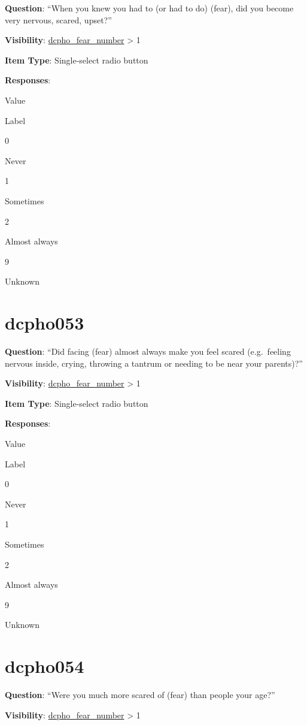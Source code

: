 \documentclass[]{book}
\begin{document}
\textbf{Question}: ``When you knew you had to (or had to do) (fear), did you become very nervous, scared, upset?''

\textbf{Visibility}: \protect\hyperlink{dcpho_fear_number}{dcpho\_fear\_number} \textgreater{} 1

\textbf{Item Type}: Single-select radio button

\textbf{Responses}:

Value

Label

0

Never

1

Sometimes

2

Almost always

9

Unknown

\hypertarget{dcpho053}{%
\section{dcpho053}\label{dcpho053}}

\textbf{Question}: ``Did facing (fear) almost always make you feel scared (e.g.~feeling nervous inside, crying, throwing a tantrum or needing to be near your parents)?''

\textbf{Visibility}: \protect\hyperlink{dcpho_fear_number}{dcpho\_fear\_number} \textgreater{} 1

\textbf{Item Type}: Single-select radio button

\textbf{Responses}:

Value

Label

0

Never

1

Sometimes

2

Almost always

9

Unknown

\hypertarget{dcpho054}{%
\section{dcpho054}\label{dcpho054}}

\textbf{Question}: ``Were you much more scared of (fear) than people your age?''

\textbf{Visibility}: \protect\hyperlink{dcpho_fear_number}{dcpho\_fear\_number} \textgreater{} 1
\end{document}
